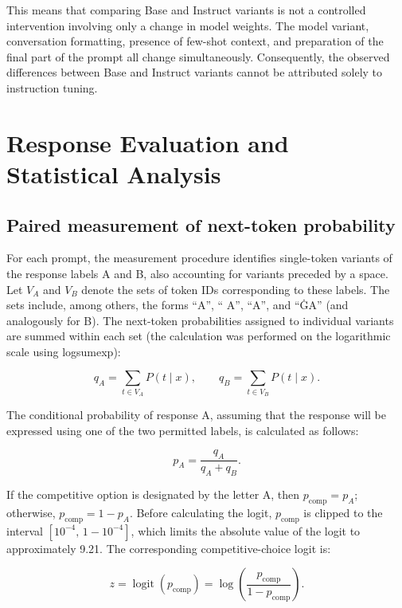 \documentclass[11pt]{article}
\newcommand{\logit}{\operatorname{logit}}
\begin{document}
This means that comparing Base and Instruct variants is not a controlled intervention involving only a change in model weights. The model variant, conversation formatting, presence of few-shot context, and preparation of the final part of the prompt all change simultaneously. Consequently, the observed differences between Base and Instruct variants cannot be attributed solely to instruction tuning.

\section{Response Evaluation and Statistical Analysis}
\subsection{Paired measurement of next-token probability}
For each prompt, the measurement procedure identifies single-token variants of the response labels A and B, also accounting for variants preceded by a space. Let $V_A$ and $V_B$ denote the sets of token IDs corresponding to these labels. The sets include, among others, the forms “A”, “ A”, “\textunderscore A”, and “ĠA” (and analogously for B). The next-token probabilities assigned to individual variants are summed within each set (the calculation was performed on the logarithmic scale using logsumexp):

\begin{equation}
    q_A = \sum_{t\in V_A} P(t\mid x),\qquad
    q_B = \sum_{t\in V_B} P(t\mid x).
\end{equation}

The conditional probability of response A, assuming that the response will be expressed using one of the two permitted labels, is calculated as follows:

\begin{equation}
    p_A = \frac{q_A}{q_A+q_B}.
\end{equation}

If the competitive option is designated by the letter A, then $p_{\mathrm{comp}}=p_A$; otherwise, $p_{\mathrm{comp}}=1-p_A$. Before calculating the logit, $p_{\mathrm{comp}}$ is clipped to the interval $[10^{-4},\,1-10^{-4}]$, which limits the absolute value of the logit to approximately 9.21. The corresponding competitive-choice logit is:

\begin{equation}
    z=\logit(p_{\mathrm{comp}})=\log\left(\frac{p_{\mathrm{comp}}}{1-p_{\mathrm{comp}}}\right).
\end{equation}
\end{document}
